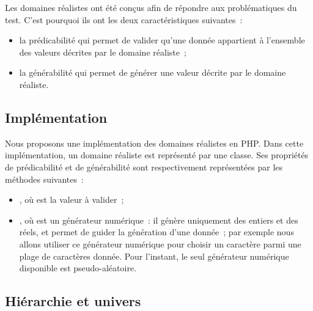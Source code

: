 \begin{definition}
\label{definition:language:realdom}

Les domaines réalistes ont été conçus afin de répondre aux problématiques du
test. C'est pourquoi ils ont les deux caractéristiques suivantes~:

\begin{itemize}

\item la {\strong prédicabilité} qui permet de valider qu'une donnée appartient
à l'ensemble des valeurs décrites par le domaine réaliste~;

\item la {\strong générabilité} qui permet de générer une valeur décrite par le
domaine réaliste.

\end{itemize}

\end{definition}

\subsection{Implémentation}
\label{subsection:language:realdom:implementation}

Nous proposons une implémentation des domaines réalistes en PHP. Dans cette
implémentation, un domaine réaliste est représenté par une classe.  Ses
propriétés de prédicabilité et de générabilité sont respectivement représentées
par les méthodes suivantes~:
%
\begin{itemize}

\item {}, où  est la valeur à valider~;

\item {}, où  est un {\strong générateur
numérique}~: il génère uniquement des entiers et des réels, et permet de guider
la génération d'une donnée~; par exemple nous allons utiliser ce générateur
numérique pour choisir un caractère parmi une plage de caractères donnée.  Pour
l'instant, le seul générateur numérique disponible est pseudo-aléatoire.

\end{itemize}

\subsection{Hiérarchie et univers}
\label{subsection:language:realdom:hierarchy}


